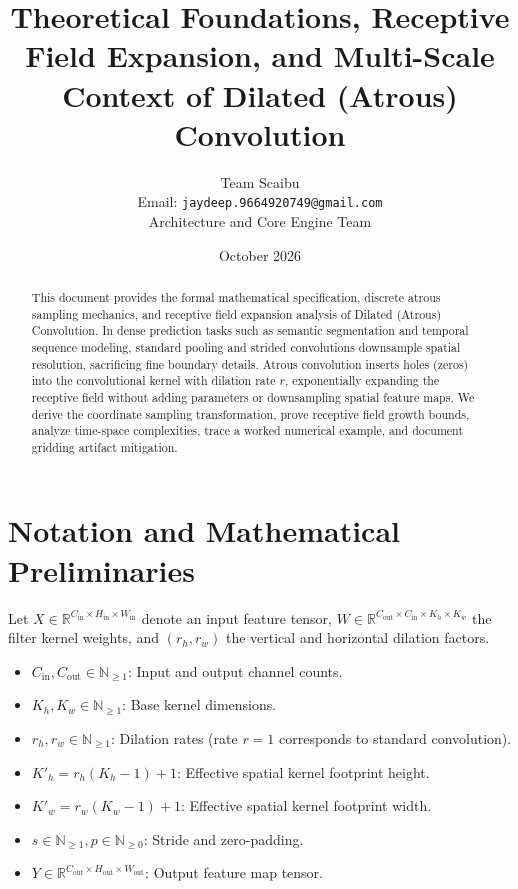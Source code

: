 \documentclass[11pt,a4paper]{article}
\title{\textbf{Theoretical Foundations, Receptive Field Expansion, and Multi-Scale Context of Dilated (Atrous) Convolution}}
\author{Team Scaibu \\ \small Email: \texttt{jaydeep.9664920749@gmail.com} \\ \small Architecture and Core Engine Team}
\date{October 2026}
\theoremstyle{definition}
\begin{document}
\maketitle

\begin{abstract}
This document provides the formal mathematical specification, discrete atrous sampling mechanics, and receptive field expansion analysis of Dilated (Atrous) Convolution. In dense prediction tasks such as semantic segmentation and temporal sequence modeling, standard pooling and strided convolutions downsample spatial resolution, sacrificing fine boundary details. Atrous convolution inserts holes (zeros) into the convolutional kernel with dilation rate $r$, exponentially expanding the receptive field without adding parameters or downsampling spatial feature maps. We derive the coordinate sampling transformation, prove receptive field growth bounds, analyze time-space complexities, trace a worked numerical example, and document gridding artifact mitigation.
\end{abstract}

\section{Notation and Mathematical Preliminaries}

Let $X \in \mathbb{R}^{C_{\text{in}} \times H_{\text{in}} \times W_{\text{in}}}$ denote an input feature tensor, $W \in \mathbb{R}^{C_{\text{out}} \times C_{\text{in}} \times K_h \times K_w}$ the filter kernel weights, and $(r_h, r_w)$ the vertical and horizontal dilation factors.

\begin{itemize}
    \item $C_{\text{in}}, C_{\text{out}} \in \mathbb{N}_{\ge 1}$: Input and output channel counts.
    \item $K_h, K_w \in \mathbb{N}_{\ge 1}$: Base kernel dimensions.
    \item $r_h, r_w \in \mathbb{N}_{\ge 1}$: Dilation rates (rate $r=1$ corresponds to standard convolution).
    \item $K'_h = r_h(K_h - 1) + 1$: Effective spatial kernel footprint height.
    \item $K'_w = r_w(K_w - 1) + 1$: Effective spatial kernel footprint width.
    \item $s \in \mathbb{N}_{\ge 1}, p \in \mathbb{N}_{\ge 0}$: Stride and zero-padding.
    \item $Y \in \mathbb{R}^{C_{\text{out}} \times H_{\text{out}} \times W_{\text{out}}}$: Output feature map tensor.
\end{itemize}
\end{document}
